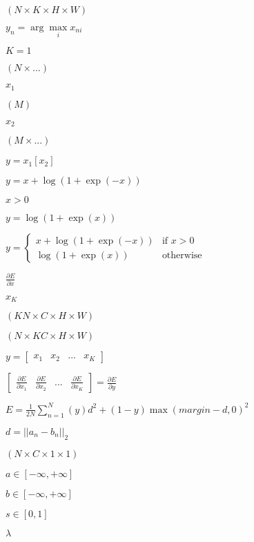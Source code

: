 \documentclass{article}
\begin{document}
$ (N \times K \times H \times W) $
\pagebreak

$ y_n = \arg\max\limits_i x_{ni} $
\pagebreak

$ K = 1 $
\pagebreak

$ (N \times ...) $
\pagebreak

$ x_1 $
\pagebreak

$ (M) $
\pagebreak

$ x_2 $
\pagebreak

$ (M \times ...) $
\pagebreak

$ y = x_1[x_2] $
\pagebreak

$ y = x + \log(1 + \exp(-x)) $
\pagebreak

$ x > 0 $
\pagebreak

$ y = \log(1 + \exp(x)) $
\pagebreak

$ y = \left\{ \begin{array}{ll} x + \log(1 + \exp(-x)) & \mbox{if } x > 0 \\ \log(1 + \exp(x)) & \mbox{otherwise} \end{array} \right. $
\pagebreak

$ \frac{\partial E}{\partial x} $
\pagebreak

$ x_K $
\pagebreak

$ (KN \times C \times H \times W) $
\pagebreak

$ (N \times KC \times H \times W) $
\pagebreak

$ y = [\begin{array}{cccc} x_1 & x_2 & ... & x_K \end{array}] $
\pagebreak

$ \left[ \begin{array}{cccc} \frac{\partial E}{\partial x_1} & \frac{\partial E}{\partial x_2} & ... & \frac{\partial E}{\partial x_K} \end{array} \right] = \frac{\partial E}{\partial y} $
\pagebreak

$ E = \frac{1}{2N} \sum\limits_{n=1}^N \left(y\right) d^2 + \left(1-y\right) \max \left(margin-d, 0\right)^2 $
\pagebreak

$ d = \left| \left| a_n - b_n \right| \right|_2 $
\pagebreak

$ (N \times C \times 1 \times 1) $
\pagebreak

$ a \in [-\infty, +\infty]$
\pagebreak

$ b \in [-\infty, +\infty]$
\pagebreak

$ s \in [0, 1]$
\pagebreak

$ \lambda $
\pagebreak
\end{document}
